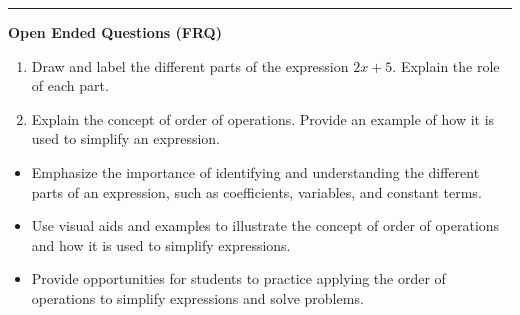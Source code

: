 \documentclass[10pt]{article}
\begin{document}
\vspace{-0.2cm}
\hrule
\vspace{0.2cm}
\textbf{\small Open Ended Questions (FRQ)}
\begin{enumerate}[label=\textbf{Q\arabic*.}, start=9, itemsep=5pt, topsep=0pt]

  \item \small Draw and label the different parts of the expression $2x + 5$. Explain the role of each part. \vspace{2cm}

  \item \small Explain the concept of order of operations. Provide an example of how it is used to simplify an expression. \vspace{2cm}

\end{enumerate}

\vfill

\begin{tcolorbox}[colback=blue!5, colframe=mainblue!50, title=\small \textbf{Chef's Tips}, fonttitle=\bfseries, bottom=1mm]
\begin{itemize}[noitemsep, topsep=2pt, leftmargin=0.5cm]
  \item \scriptsize Emphasize the importance of identifying and understanding the different parts of an expression, such as coefficients, variables, and constant terms.\item \scriptsize Use visual aids and examples to illustrate the concept of order of operations and how it is used to simplify expressions.\item \scriptsize Provide opportunities for students to practice applying the order of operations to simplify expressions and solve problems.
\end{itemize}
\end{tcolorbox}
\end{document}

